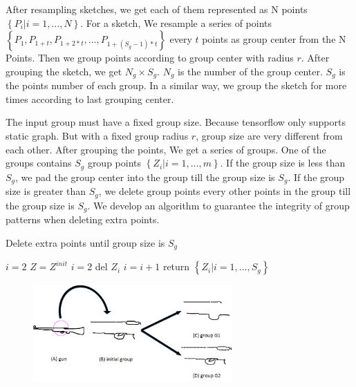 After resampling sketches, we get each of them represented as N points $\left\{P_i| i = 1,..., N\right\}$. For a sketch, We resample a series of points $\left\{P_{1}, P_{1+t}, P_{1+2*t}, ..., P_{1+(S_g-1)*t}\right\}$ every $t$ points as group center from the N Points. Then we group points according to group center with radius $r$. After grouping the sketch, we get $N_{g} \times S_{g}$. $N_{g}$ is the number of the group center. $S_{g}$ is the points number of each group. In a similar way, we group the sketch for more times according to last grouping center.

The input group must have a fixed group size. Because tensorflow only supports static graph. But with a fixed group radius $r$, group size are very different from each other. After grouping the points, We get a series of groups. One of the groups contains $S_g$ group points $\left\{ Z_i| i = 1, ..., m \right\}$. If the group size is less than $S_{g}$, we pad the group center into the group till the group size is $S_{g}$. If the group size is greater than $S_{g}$, we delete group points every other points in the group till the group size is $S_{g}$. We develop an algorithm to guarantee the integrity of group patterns when deleting extra points.

\begin{algorithm}[h]
\label{alg:group}
    \caption{Delete extra points until group size is $S_g$}
    $i = 2$\;
    $Z = Z^{init}$\;
    {
        {
            $i = 2$\;
        }
        del $Z_i$\;
        $i = i+1$\;
    }
    return $\left\{ Z_i| i = 1, ..., S_g \right\}$\;
\end{algorithm}

\begin{figure}
    \center
    \includegraphics[width=3in]{images/group.png}
    \label{fig:group}
\end{figure}


